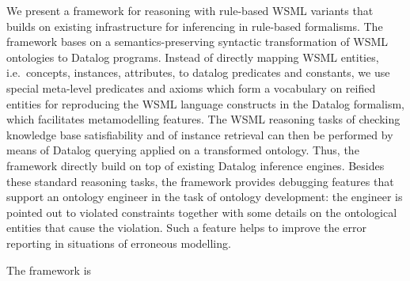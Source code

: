 We present a framework for reasoning with rule-based WSML variants
that builds on existing infrastructure for inferencing in
rule-based formalisms. The framework bases on a
semantics-preserving syntactic transformation of WSML ontologies
to Datalog programs. Instead of directly mapping WSML entities,
i.e.\ concepts, instances, attributes, to datalog predicates and
constants, we use special meta-level predicates and axioms which
form a vocabulary on reified entities for reproducing the WSML
language constructs in the Datalog formalism, which facilitates
metamodelling features. The WSML reasoning tasks of checking
knowledge base satisfiability and of instance retrieval can then
be performed by means of Datalog querying applied on a transformed
ontology. Thus, the framework directly build on top of existing
Datalog inference engines. Besides these standard reasoning tasks,
the framework provides debugging features that support an ontology
engineer in the task of ontology development: the engineer is
pointed out to violated constraints together with some details on
the ontological entities that cause the violation. Such a feature
helps to improve the error reporting in situations of erroneous
modelling.

The framework is
